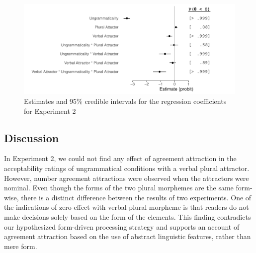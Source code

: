 \documentclass[doc,a4paper,man,natbib,floatsintext,noextraspace]{apa6}\usepackage[]{graphicx}\usepackage[]{color}
\makeatletter
\def\maxwidth{ %
  \ifdim\Gin@nat@width>\linewidth
    \linewidth
  \else
    \Gin@nat@width
  \fi
}
\newenvironment{knitrout}{}{} %
\makeatother
\begin{document}
\begin{knitrout}
\color{fgcolor}\begin{figure}

{\centering \includegraphics[width=\maxwidth]{figure/exp2ResponseModel-1} 

}

\caption[Estimates and 95\% credible intervals for the regression coefficients for Experiment 2]{Estimates and 95\% credible intervals for the regression coefficients for Experiment 2}\label{fig:exp2ResponseModel}
\end{figure}


\end{knitrout}


\subsection{Discussion} \label{sec:exp2:discussion}


In Experiment 2, we could not find any effect of agreement attraction in the acceptability ratings of ungrammatical conditions with a verbal plural attractor. However, number agreement attractions were observed when the attractors were nominal. Even though the forms of the two plural morphemes are the same form-wise, there is a distinct difference between the results of two experiments. One of the indications of zero-effect with verbal plural morpheme is that readers do not make decisions solely based on the form of the elements. This finding contradicts our hypothesized form-driven processing strategy and supports an account of agreement attraction based on the use of abstract linguistic features, rather than mere form.
\end{document}
